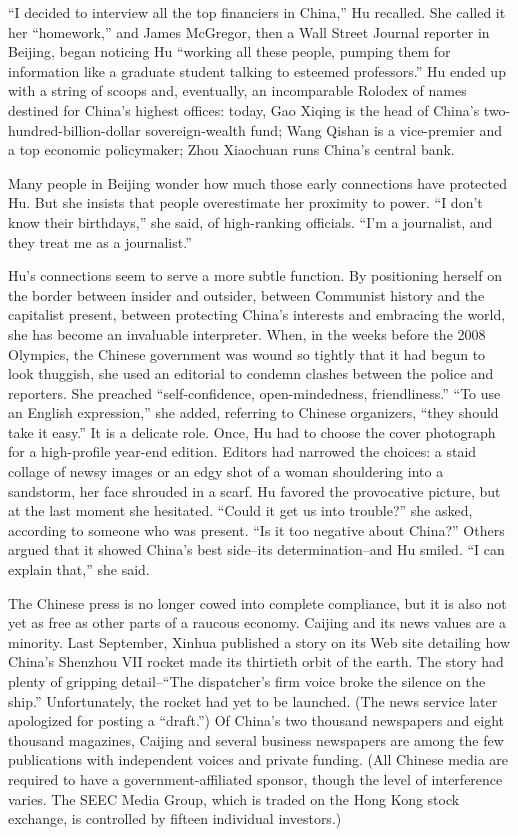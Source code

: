 ﻿\documentclass[12pt]{article}
\begin{document}
``I decided to interview all the top financiers in China,'' Hu recalled. She called it her
``homework,'' and James McGregor, then a Wall Street Journal reporter in Beijing, began noticing Hu
``working all these people, pumping them for information like a graduate student talking to esteemed
professors.'' Hu ended up with a string of scoops and, eventually, an incomparable Rolodex of names
destined for China's highest offices: today, Gao Xiqing is the head of China's
two-hundred-billion-dollar sovereign-wealth fund; Wang Qishan is a vice-premier and a top economic
policymaker; Zhou Xiaochuan runs China's central bank.

Many people in Beijing wonder how much those early connections have protected Hu. But she insists
that people overestimate her proximity to power. ``I don't know their birthdays,'' she said, of
high-ranking officials. ``I'm a journalist, and they treat me as a journalist.''

Hu's connections seem to serve a more subtle function. By positioning herself on the border between
insider and outsider, between Communist history and the capitalist present, between protecting
China's interests and embracing the world, she has become an invaluable interpreter. When, in the
weeks before the 2008 Olympics, the Chinese government was wound so tightly that it had begun to
look thuggish, she used an editorial to condemn clashes between the police and reporters. She
preached ``self-confidence, open-mindedness, friendliness.'' ``To use an English expression,'' she
added, referring to Chinese organizers, ``they should take it easy.'' It is a delicate role. Once,
Hu had to choose the cover photograph for a high-profile year-end edition. Editors had narrowed the
choices: a staid collage of newsy images or an edgy shot of a woman shouldering into a sandstorm,
her face shrouded in a scarf. Hu favored the provocative picture, but at the last moment she
hesitated. ``Could it get us into trouble?'' she asked, according to someone who was present. ``Is
it too negative about China?'' Others argued that it showed China's best side--its
determination--and Hu smiled. ``I can explain that,'' she said.

The Chinese press is no longer cowed into complete compliance, but it is also not yet as free as
other parts of a raucous economy. Caijing and its news values are a minority. Last September, Xinhua
published a story on its Web site detailing how China's Shenzhou VII rocket made its thirtieth orbit
of the earth. The story had plenty of gripping detail--``The dispatcher's firm voice broke the
silence on the ship.'' Unfortunately, the rocket had yet to be launched. (The news service later
apologized for posting a ``draft.'') Of China's two thousand newspapers and eight thousand
magazines, Caijing and several business newspapers are among the few publications with independent
voices and private funding. (All Chinese media are required to have a government-affiliated sponsor,
though the level of interference varies. The SEEC Media Group, which is traded on the Hong Kong
stock exchange, is controlled by fifteen individual investors.)
\end{document}
